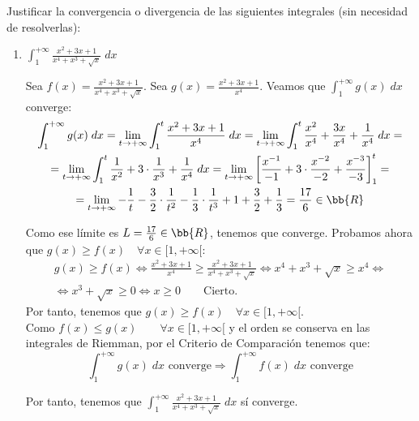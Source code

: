 \begin{ejercicio} Justificar la convergencia o divergencia de las siguientes integrales (sin necesidad de resolverlas):
\begin{enumerate}

    \item $\displaystyle \int_1^{+\infty} \frac{x^2+3x+1}{x^4+x^3+\sqrt{x}}\;dx$

    Sea $f(x)=\frac{x^2+3x+1}{x^4+x^3+\sqrt{x}}$.
    Sea $g(x)=\frac{x^2+3x+1}{x^4}$. Veamos que $\int_1^{+\infty} g(x)\;dx$ converge:
    \begin{multline*}
        \int_1^{+\infty} g(x)\;dx
        = \lim_{t\to +\infty} \int_1^t \frac{x^2+3x+1}{x^4}\;dx
        = \lim_{t\to +\infty} \int_1^t \frac{x^2}{x^4} +\frac{3x}{x^4} +\frac{1}{x^4}\;dx
        =\\= \lim_{t\to +\infty} \int_1^t \frac{1}{x^2} +3\cdot \frac{1}{x^3} +\frac{1}{x^4}\;dx
        = \lim_{t\to +\infty} \left[\frac{x^{-1}}{-1}+3\cdot \frac{x^{-2}}{-2} +\frac{x^{-3}}{-3}\right]_1^t
        =\\=\lim_{t\to +\infty} -\frac{1}{t} -\frac{3}{2}\cdot \frac{1}{t^2} -\frac{1}{3}\cdot \frac{1}{t^3} +1+\frac{3}{2}+\frac{1}{3} = \frac{17}{6}\in \bb{R}
    \end{multline*}

    Como ese límite es $L=\frac{17}{6}\in \bb{R}$, tenemos que converge. Probamos ahora que $g(x)\geq f(x) \quad \forall x\in [1,+\infty[$:
    \begin{multline*}
        g(x)\geq f(x) \Longleftrightarrow \frac{x^2+3x+1}{x^4} \geq \frac{x^2+3x+1}{x^4+x^3+\sqrt{x}}
        \Longleftrightarrow x^4+x^3+\sqrt{x} \geq x^4 \Longleftrightarrow \\ \Longleftrightarrow
        x^3+\sqrt{x} \geq 0 \Longleftrightarrow x\geq 0 \qquad \text{Cierto.}
    \end{multline*}
    Por tanto, tenemos que $g(x)\geq f(x)\quad \forall x\in [1,+\infty[$.\\

    Como $f(x)\leq g(x) \qquad \forall x\in [1, +\infty[$ y el orden se conserva en las integrales de Riemman, por el Criterio de Comparación tenemos que:
    \begin{equation*}
        \int_1^{+\infty} g(x)\;dx \text{ converge} \Longrightarrow 
        \int_1^{+\infty} f(x)\;dx \text{ converge}
    \end{equation*}

    Por tanto, tenemos que  $\displaystyle \int_1^{+\infty} \frac{x^2+3x+1}{x^4+x^3+\sqrt{x}}\;dx$ sí converge.





\end{enumerate}
\end{ejercicio}
